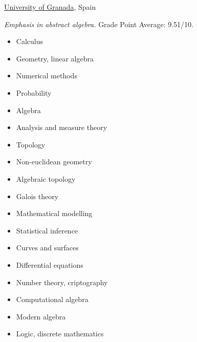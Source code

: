 \documentclass[nocolors]{friggeri-cv-a4}
\begin{document}
\begin{entrylist}


{\href{http://www.ugr.es/en/}{University of Granada}, Spain}
{\emph{Emphasis in abstract algebra.} Grade Point Average: 9.51/10.
  {\small
  \begin{multicols}{2}
    \begin{itemize}[topsep=0pt]
    \item Calculus
    \item Geometry, linear algebra
    \item Numerical methods
    \item Probability
    \item Algebra
    \item Analysis and measure theory
    \item Topology
    \item Non-euclidean geometry
    \item Algebraic topology
    \item Galois theory
    \item Mathematical modelling
    \item Statistical inference
    \item Curves and surfaces
    \item Differential equations
    \item Number theory, criptography
    \item Computational algebra
    \item Modern algebra
    \item Logic, discrete mathematics
    \end{itemize}
  \end{multicols}
  }
}


\end{entrylist}
\end{document}
